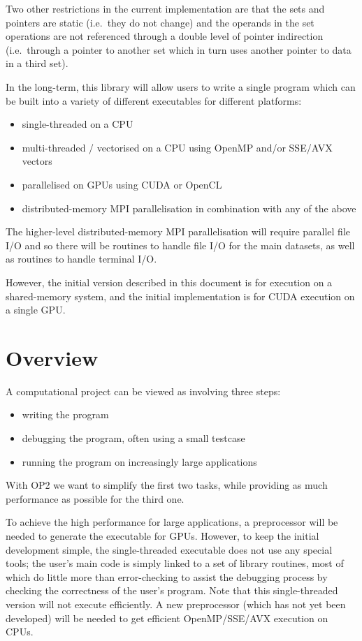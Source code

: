 Two other restrictions in the current implementation are that 
the sets and pointers are static (i.e.~they do not change) and the 
operands in the set operations are not referenced through a double 
level of pointer indirection (i.e.~through a pointer to another set 
which in turn uses another pointer to data in a third set).

In the long-term, this library will allow users to write a single
program which can be built into a variety of different executables for
different platforms:
\begin{itemize}
\item
single-threaded on a CPU
\item
multi-threaded / vectorised on a CPU using OpenMP and/or SSE/AVX vectors
\item
parallelised on GPUs using CUDA or OpenCL
\item
distributed-memory MPI parallelisation in combination with any of the above
\end{itemize}

The higher-level distributed-memory MPI parallelisation will 
require parallel file I/O and so there will be routines to handle 
file I/O for the main datasets, as well as routines to handle 
terminal I/O.

However, the initial version described in this document is for 
execution on a shared-memory system, and the initial implementation
is for CUDA execution on a single GPU.

\newpage
\section{Overview}

A computational project can be viewed as involving three steps:
\begin{itemize}
\item
writing the program
\item
debugging the program, often using a small testcase
\item
running the program on increasingly large applications
\end{itemize}

With OP2 we want to simplify the first two tasks, while providing
as much performance as possible for the third one.  

To achieve the high performance for large applications, a 
preprocessor will be needed to generate the executable for GPUs.
However, to keep the initial development simple, the single-threaded 
executable does not use any special tools; the user's main code
is simply linked to a set of library routines, most of which do
little more than error-checking to assist the debugging process 
by checking the correctness of the user's program.  Note that this 
single-threaded version will not execute efficiently.  A new 
preprocessor (which has not yet been developed) will be needed 
to get efficient OpenMP/SSE/AVX execution on CPUs.

